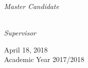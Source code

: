 \thispagestyle{empty}
\begin{center}
\large


\vspace*{3cm}
\begingroup
	\large
	\spacedallcaps{\myUni}\\\medskip    
    \normalsize
    \color{black}\spacedallcaps{\myDepartment} \\
    \color{black}{\mySubtitle}
\endgroup

\vfill

\begingroup
\large \color{Maroon}\spacedallcaps{\myTitle} \\ \bigskip %
\endgroup
\vfill


\textit{Master Candidate} \\ \smallskip
\spacedlowsmallcaps{\myName} \\ \bigskip \bigskip

\textit{Supervisor} \\ \smallskip
{}



\centering

\vfill



{
	\normalsize
    April 18, 2018\\
	Academic Year 2017/2018 %
}




    
\end{center}
